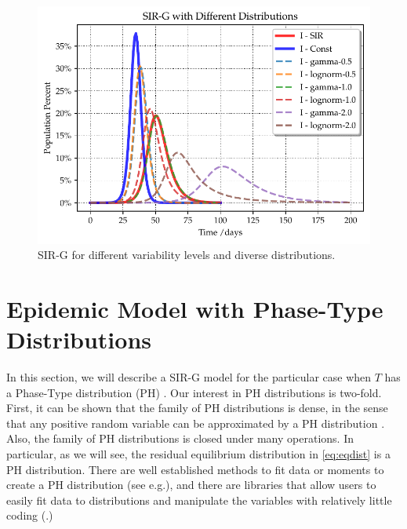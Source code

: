 \documentclass[USenglish,10pt]{article}
\newcommand{\eg}{e.g.\xspace}
\begin{document}
\begin{figure}
	\centering
	\includegraphics[width=.8\linewidth]{Variance-Analysis.pdf}
	\caption{SIR-G for different variability levels and diverse distributions.}
	\label{fig:var}
\end{figure}

\section{Epidemic Model with Phase-Type Distributions}\label{sc:PH}

In this section, we will describe a SIR-G model for the particular case when $T$ has a Phase-Type distribution (PH) \cite{neut81,lato.rama99}. Our interest in PH distributions is two-fold. First, it can be shown that the family of PH distributions is dense, in the sense that any positive random variable can be approximated by a PH distribution \cite{neut81}.
Also, the family of PH distributions is closed under many operations. In particular, as we will see, the residual equilibrium distribution in \eqref{eq:eqdist} is a PH distribution.
There are well established methods to fit data or moments to create a PH distribution (see \eg \cite{bobb.horv.ea03,bobb.horv.ea05,thum.buch.ea05}), and there are libraries that allow users to easily fit data to distributions and manipulate the variables with relatively little coding (\cite{Per.ea.17,tele.torv20}.)
\end{document}
